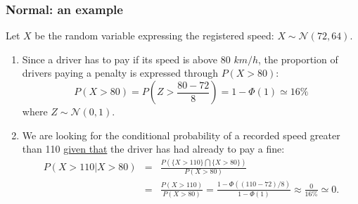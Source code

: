 \documentclass[notes=show,smaller,handout]{beamer}\usepackage[]{graphicx}\usepackage[]{color}
\begin{document}
\begin{frame}%

\frametitle{Normal: an example}

\begin{example}[cont'd]
Let $X$ be the random variable expressing the registered speed: $X \sim \mathcal{N}(72,64)$.
\begin{enumerate}
  \item Since a driver has to pay if its speed is above  $80$ $km/h$, the proportion of drivers paying a penalty is expressed  through $P(X>80)$:
\begin{equation*}
P(X>80)= P\left(Z>\frac{80-72}{8} \right)=1-\Phi(1) \simeq 16 \%
\end{equation*}
where $Z \sim \mathcal{N}(0,1)$.
  \item We are looking for the conditional probability of a recorded speed greater than 110 \underline{given that} the driver has had already to pay a fine:
  \begin{eqnarray*}
  P(X>110 \vert X>80) &=&  \frac{P(\{X>110\} \bigcap \{X>80\})}{P(X>80)} \\
   &=& \frac{P(X>110)}{P(X>80)} = \frac{1- \Phi((110-72)/8)}{1-\Phi(1)}\approx \frac{0}{16\%}\simeq 0.
  \end{eqnarray*}


\end{enumerate}



\end{example}
\end{frame}



%
%
%
%
%
\end{document}
